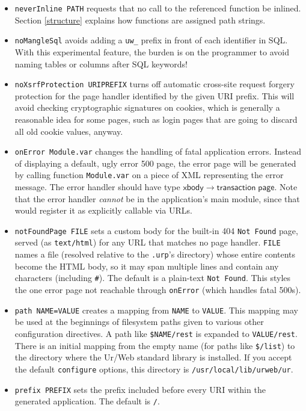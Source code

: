 \documentclass{article}
\newcommand{\mt}[1]{\mathsf{#1}}
\begin{document}
\begin{itemize}
\item \texttt{neverInline PATH} requests that no call to the referenced function be inlined.  Section \ref{structure} explains how functions are assigned path strings.
\item \texttt{noMangleSql} avoids adding a \texttt{uw\_} prefix in front of each identifier in SQL.  With this experimental feature, the burden is on the programmer to avoid naming tables or columns after SQL keywords!
\item \texttt{noXsrfProtection URIPREFIX} turns off automatic cross-site request forgery protection for the page handler identified by the given URI prefix.  This will avoid checking cryptographic signatures on cookies, which is generally a reasonable idea for some pages, such as login pages that are going to discard all old cookie values, anyway.
\item \texttt{onError Module.var} changes the handling of fatal application errors.  Instead of displaying a default, ugly error 500 page, the error page will be generated by calling function \texttt{Module.var} on a piece of XML representing the error message.  The error handler should have type $\mt{xbody} \to \mt{transaction} \; \mt{page}$.  Note that the error handler \emph{cannot} be in the application's main module, since that would register it as explicitly callable via URLs.
\item \texttt{notFoundPage FILE} sets a custom body for the built-in 404 \texttt{Not Found} page, served (as \texttt{text/html}) for any URL that matches no page handler.  \texttt{FILE} names a file (resolved relative to the \texttt{.urp}'s directory) whose entire contents become the HTML body, so it may span multiple lines and contain any characters (including \texttt{\#}).  The default is a plain-text \texttt{Not Found}.  This styles the one error page not reachable through \texttt{onError} (which handles fatal 500s).
\item \texttt{path NAME=VALUE} creates a mapping from \texttt{NAME} to \texttt{VALUE}.  This mapping may be used at the beginnings of filesystem paths given to various other configuration directives.  A path like \texttt{\$NAME/rest} is expanded to \texttt{VALUE/rest}.  There is an initial mapping from the empty name (for paths like \texttt{\$/list}) to the directory where the Ur/Web standard library is installed.  If you accept the default \texttt{configure} options, this directory is \texttt{/usr/local/lib/urweb/ur}.
\item \texttt{prefix PREFIX} sets the prefix included before every URI within the generated application.  The default is \texttt{/}.

\end{itemize}
\end{document}
